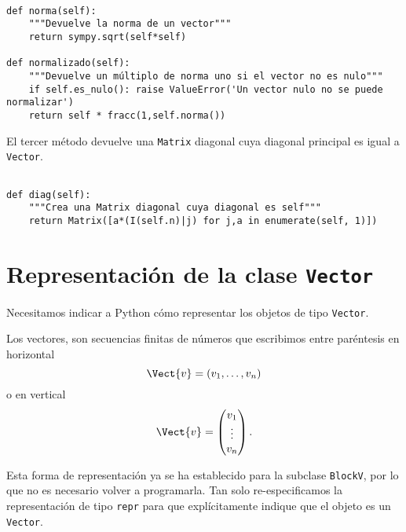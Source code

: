 \documentclass[11pt]{report}
\begin{document}
\begin{verbatim}

def norma(self):
    """Devuelve la norma de un vector"""
    return sympy.sqrt(self*self)
                                                               
def normalizado(self):
    """Devuelve un múltiplo de norma uno si el vector no es nulo"""
    if self.es_nulo(): raise ValueError('Un vector nulo no se puede normalizar')
    return self * fracc(1,self.norma())

\end{verbatim}

El tercer método devuelve una \texttt{Matrix} diagonal cuya diagonal
principal es igual a \texttt{Vector}.

\begin{verbatim}

def diag(self):
    """Crea una Matrix diagonal cuya diagonal es self"""
    return Matrix([a*(I(self.n)|j) for j,a in enumerate(self, 1)])

\end{verbatim}

\section{Representación de la clase \texttt{Vector}}
\label{sec:orgec676a2}

Necesitamos indicar a Python cómo representar los objetos de tipo
\texttt{Vector}.

Los vectores, son secuencias finitas de números que escribimos entre
paréntesis en horizontal
\begin{displaymath}
  \Vect{v}=(v_1,\ldots,v_n)
\end{displaymath}
o en vertical
\begin{displaymath}
  \Vect{v}=\begin{pmatrix}v_1\\ \vdots \\ v_n\end{pmatrix}.
\end{displaymath}

Esta forma de representación ya se ha establecido para la subclase
\texttt{BlockV}, por lo que no es necesario volver a programarla. Tan solo
re-especificamos la representación de tipo \texttt{repr} para que
explícitamente indique que el objeto es un \texttt{Vector}.
\end{document}
